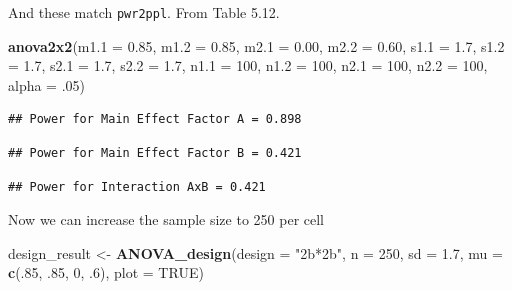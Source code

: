 \documentclass[
]{book}
\newenvironment{Shaded}{\begin{snugshade}}{\end{snugshade}}
\newcommand{\DataTypeTok}[1]{\textcolor[rgb]{0.13,0.29,0.53}{#1}}
\newcommand{\DecValTok}[1]{\textcolor[rgb]{0.00,0.00,0.81}{#1}}
\newcommand{\FloatTok}[1]{\textcolor[rgb]{0.00,0.00,0.81}{#1}}
\newcommand{\KeywordTok}[1]{\textcolor[rgb]{0.13,0.29,0.53}{\textbf{#1}}}
\newcommand{\NormalTok}[1]{#1}
\newcommand{\OtherTok}[1]{\textcolor[rgb]{0.56,0.35,0.01}{#1}}
\newcommand{\StringTok}[1]{\textcolor[rgb]{0.31,0.60,0.02}{#1}}
\begin{document}
And these match \texttt{pwr2ppl}. From Table 5.12.

\begin{Shaded}
\begin{Highlighting}[]
\KeywordTok{anova2x2}\NormalTok{(}\DataTypeTok{m1.1 =} \FloatTok{0.85}\NormalTok{, }\DataTypeTok{m1.2 =} \FloatTok{0.85}\NormalTok{, }\DataTypeTok{m2.1 =} \FloatTok{0.00}\NormalTok{, }\DataTypeTok{m2.2 =} \FloatTok{0.60}\NormalTok{,}
         \DataTypeTok{s1.1 =} \FloatTok{1.7}\NormalTok{, }\DataTypeTok{s1.2 =} \FloatTok{1.7}\NormalTok{, }\DataTypeTok{s2.1 =} \FloatTok{1.7}\NormalTok{, }\DataTypeTok{s2.2 =} \FloatTok{1.7}\NormalTok{,}
         \DataTypeTok{n1.1 =} \DecValTok{100}\NormalTok{, }\DataTypeTok{n1.2 =} \DecValTok{100}\NormalTok{, }\DataTypeTok{n2.1 =} \DecValTok{100}\NormalTok{, }\DataTypeTok{n2.2 =} \DecValTok{100}\NormalTok{,}
         \DataTypeTok{alpha =} \FloatTok{.05}\NormalTok{)}
\end{Highlighting}
\end{Shaded}

\begin{verbatim}
## Power for Main Effect Factor A = 0.898
\end{verbatim}

\begin{verbatim}
## Power for Main Effect Factor B = 0.421
\end{verbatim}

\begin{verbatim}
## Power for Interaction AxB = 0.421
\end{verbatim}

Now we can increase the sample size to 250 per cell

\begin{Shaded}
\begin{Highlighting}[]
\NormalTok{design_result <-}\StringTok{ }\KeywordTok{ANOVA_design}\NormalTok{(}\DataTypeTok{design =} \StringTok{"2b*2b"}\NormalTok{,}
                              \DataTypeTok{n =} \DecValTok{250}\NormalTok{,}
                              \DataTypeTok{sd =} \FloatTok{1.7}\NormalTok{,}
                              \DataTypeTok{mu =} \KeywordTok{c}\NormalTok{(.}\DecValTok{85}\NormalTok{, }\FloatTok{.85}\NormalTok{, }
                                     \DecValTok{0}\NormalTok{, }\FloatTok{.6}\NormalTok{),}
                              \DataTypeTok{plot =} \OtherTok{TRUE}\NormalTok{)}
\end{Highlighting}
\end{Shaded}
\end{document}

